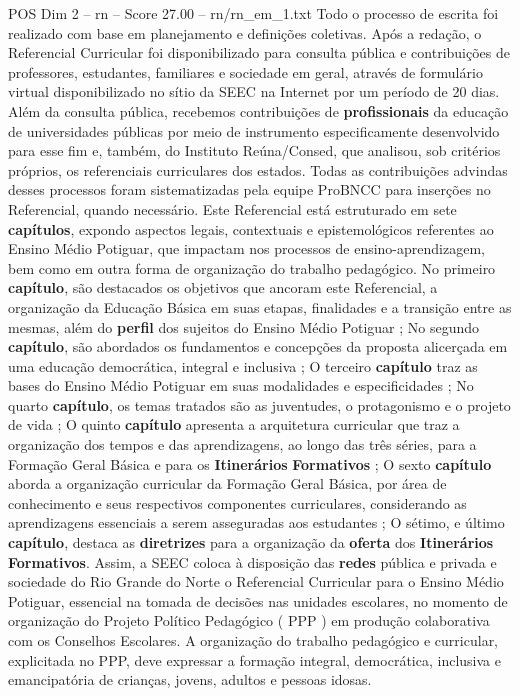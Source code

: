 \begin{textsample}{POS Dim 2 – rn – Score 27.00 – rn/rn\_em\_1.txt}
Todo o processo de escrita foi realizado com base em planejamento e definições coletivas.
Após a redação, o Referencial Curricular foi disponibilizado para consulta pública e contribuições de professores, estudantes, familiares e sociedade em geral, através de formulário virtual disponibilizado no sítio da SEEC na Internet por um período de 20 dias.
Além da consulta pública, recebemos contribuições de \textbf{profissionais} da educação de universidades públicas por meio de instrumento especificamente desenvolvido para esse fim e, também, do Instituto Reúna/Consed, que analisou, sob critérios próprios, os referenciais curriculares dos estados.
Todas as contribuições advindas desses processos foram sistematizadas pela equipe ProBNCC para inserções no Referencial, quando necessário.
Este Referencial está estruturado em sete \textbf{capítulos}, expondo aspectos legais, contextuais e epistemológicos referentes ao Ensino Médio Potiguar, que impactam nos processos de ensino-aprendizagem, bem como em outra forma de organização do trabalho pedagógico.
No primeiro \textbf{capítulo}, são destacados os objetivos que ancoram este Referencial, a organização da Educação Básica em suas etapas, finalidades e a transição entre as mesmas, além do \textbf{perfil} dos sujeitos do Ensino Médio Potiguar ; No segundo \textbf{capítulo}, são abordados os fundamentos e concepções da proposta alicerçada em uma educação democrática, integral e inclusiva ; O terceiro \textbf{capítulo} traz as bases do Ensino Médio Potiguar em suas modalidades e especificidades ; No quarto \textbf{capítulo}, os temas tratados são as juventudes, o protagonismo e o projeto de vida ; O quinto \textbf{capítulo} apresenta a arquitetura curricular que traz a organização dos tempos e das aprendizagens, ao longo das três séries, para a Formação Geral Básica e para os \textbf{Itinerários} \textbf{Formativos} ; O sexto \textbf{capítulo} aborda a organização curricular da Formação Geral Básica, por área de conhecimento e seus respectivos componentes curriculares, considerando as aprendizagens essenciais a serem asseguradas aos estudantes ; O sétimo, e último \textbf{capítulo}, destaca as \textbf{diretrizes} para a organização da \textbf{oferta} dos \textbf{Itinerários} \textbf{Formativos}.
Assim, a SEEC coloca à disposição das \textbf{redes} pública e privada e sociedade do Rio Grande do Norte o Referencial Curricular para o Ensino Médio Potiguar, essencial na tomada de decisões nas unidades escolares, no momento de organização do Projeto Político Pedagógico ( PPP ) em produção colaborativa com os Conselhos Escolares.
A organização do trabalho pedagógico e curricular, explicitada no PPP, deve expressar a formação integral, democrática, inclusiva e emancipatória de crianças, jovens, adultos e pessoas idosas.

\end{textsample}

